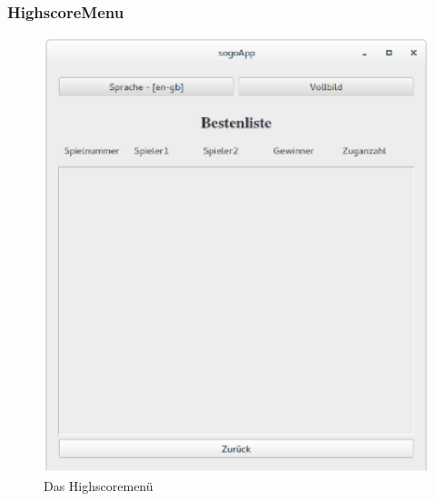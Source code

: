 \documentclass[a4paper]{scrartcl}
\begin{document}
\subsubsection{HighscoreMenu}\label{ch:HighscoreMenu}
\begin{figure}[H]
 	\centering
 	\includegraphics[scale=0.35]{graphics/highscore.eps}
 	\caption{Das Highscoremenü}
 	\label{fig:Highscoremenü}
\end{figure}
\end{document}
